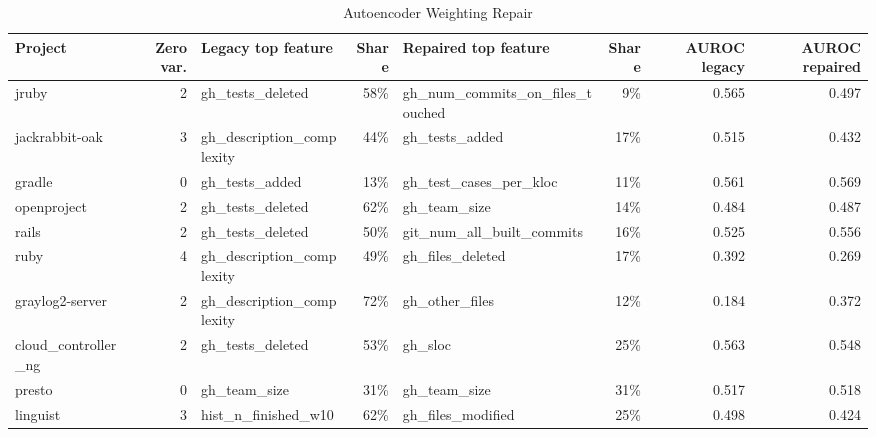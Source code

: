 \begin{table}[htbp]
\centering
\footnotesize\setlength{\tabcolsep}{2.4pt}
\caption{Autoencoder Weighting Repair}
\label{tab:ae_repair}
\begin{tabular}{lrlrlrrr}
\toprule
Project & Zero var. & Legacy top feature & Share & Repaired top feature & Share & AUROC legacy & AUROC repaired \\
\midrule
jruby & 2 & gh\_tests\_deleted & 58\% & gh\_num\_commits\_on\_files\_touched & 9\% & 0.565 & 0.497 \\
jackrabbit-oak & 3 & gh\_description\_complexity & 44\% & gh\_tests\_added & 17\% & 0.515 & 0.432 \\
gradle & 0 & gh\_tests\_added & 13\% & gh\_test\_cases\_per\_kloc & 11\% & 0.561 & 0.569 \\
openproject & 2 & gh\_tests\_deleted & 62\% & gh\_team\_size & 14\% & 0.484 & 0.487 \\
rails & 2 & gh\_tests\_deleted & 50\% & git\_num\_all\_built\_commits & 16\% & 0.525 & 0.556 \\
ruby & 4 & gh\_description\_complexity & 49\% & gh\_files\_deleted & 17\% & 0.392 & 0.269 \\
graylog2-server & 2 & gh\_description\_complexity & 72\% & gh\_other\_files & 12\% & 0.184 & 0.372 \\
cloud\_controller\_ng & 2 & gh\_tests\_deleted & 53\% & gh\_sloc & 25\% & 0.563 & 0.548 \\
presto & 0 & gh\_team\_size & 31\% & gh\_team\_size & 31\% & 0.517 & 0.518 \\
linguist & 3 & hist\_n\_finished\_w10 & 62\% & gh\_files\_modified & 25\% & 0.498 & 0.424 \\
\bottomrule
\end{tabular}
\end{table}
